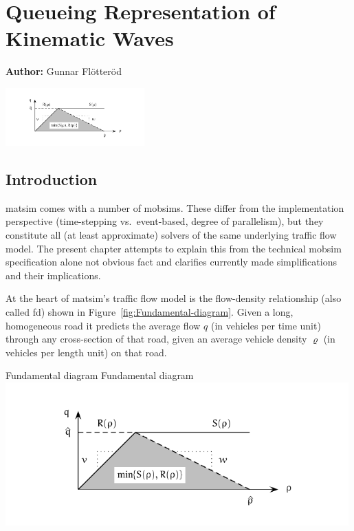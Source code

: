 \chapter{Queueing Representation of Kinematic Waves}
\label{ch:kinematicwaves}

\hfill \textbf{Author:} Gunnar Flötteröd

\begin{center} \includegraphics[width=0.4\textwidth, angle=0]{understanding/figures/waves/fig0.pdf} \end{center}


\newcommand{\SINGLEQUEUESIM}{\gls{qsim}}
\newcommand{\DOUBLEQUEUESIM}{\gls{jdeqsim}}

\section{\label{sec:Introduction}Introduction}

\gls{matsim} comes with a number of \glspl{mobsim}. These differ from the
implementation perspective (time-stepping vs.\ event-based, degree
of parallelism), but they constitute all (at least approximate) solvers
of the same underlying traffic flow model. The present chapter attempts
to explain this from the technical mobsim specification alone not
obvious fact and clarifies currently made simplifications and their
implications.

At the heart of \gls{matsim}'s traffic flow model is the flow-density relationship
(also called \gls{fd}) shown in Figure~\ref{fig:Fundamental-diagram}.
Given a long, homogeneous
road it predicts the average flow $q$ (in vehicles per time unit)
through any cross-section of that road, given an average vehicle density
$\varrho$ (in vehicles per length unit) on that road. 

\createfigure%
{Fundamental diagram}%
{Fundamental diagram}%
{\label{fig:Fundamental-diagram}}%
{\includegraphics[width=0.99\textwidth, angle=0]{understanding/figures/waves/fig0.pdf}}%
{}

